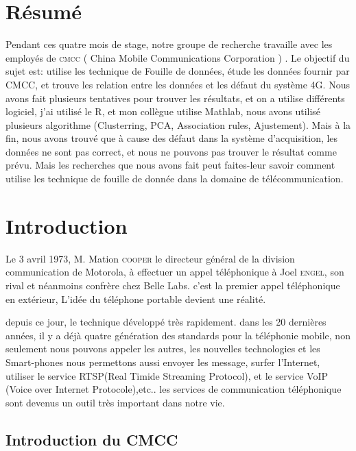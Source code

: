 
\section{Résumé} 

Pendant ces quatre mois de stage, notre groupe de recherche travaille avec les employés de \textsc{cmcc} ( China Mobile Communications Corporation ) . Le objectif du sujet est: utilise les technique de Fouille de données, étude les données fournir par CMCC, et trouve les relation entre les données et les défaut du système 4G. Nous avons fait plusieurs tentatives pour trouver les résultats, et on a utilise différents logiciel, j'ai utilisé le R, et mon collègue utilise Mathlab, nous avons utilisé plusieurs algorithme (Clusterring, PCA, Association rules, Ajustement). Mais à la fin,  nous avons trouvé que à cause des défaut dans la système d'acquisition, les données ne sont pas correct, et nous ne pouvons pas trouver le résultat comme prévu. Mais les recherches que nous avons fait peut faites-leur savoir comment utilise les technique de fouille de donnée dans la domaine de télécommunication.

\section{Introduction} 
 
Le 3 avril 1973, M. Mation \textsc{cooper} le directeur général de la division communication de Motorola, à effectuer un appel téléphonique à Joel \textsc{engel}, son rival et néanmoins confrère chez \textsf{Belle Labs}. c'est la premier appel téléphonique en extérieur, L'idée du téléphone portable devient une réalité. 

depuis ce jour, le technique développé très rapidement. dans les 20 dernières années, il y a déjà quatre génération des standards pour la téléphonie mobile, non seulement nous pouvons appeler les autres, les nouvelles technologies et les Smart-phones nous permettons aussi envoyer les message, surfer l'Internet, utiliser le service RTSP(Real Timide Streaming Protocol), et le service VoIP (Voice over Internet Protocole),etc.. les services de communication téléphonique sont devenus un outil très important dans notre vie.
 
 \subsection{Introduction du CMCC}
 
